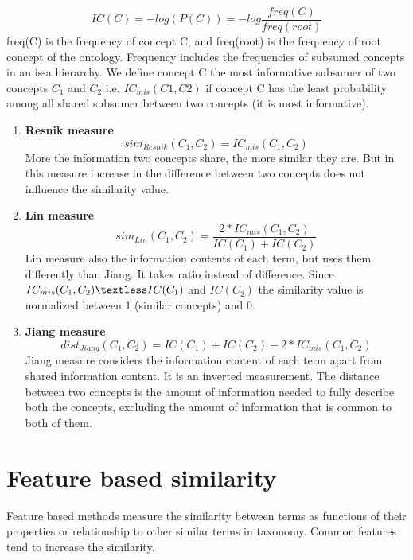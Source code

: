 \begin{equation}
IC (C) = - log(P(C)) = -log \frac{ freq(C) } { freq(root) } 
\end{equation}
freq(C) is the frequency of concept C, and freq(root) is the frequency of root concept of the ontology. Frequency includes the frequencies of subsumed concepts in an is-a hierarchy. We define concept C the most informative subsumer of two concepts $C_1$ and $C_2$ i.e. $IC_{mis}(C1,C2)$ if concept C has the least probability among all shared subsumer between two concepts (it is most informative).

\begin{enumerate}

\item{\textbf{Resnik measure}}
\begin{equation}
sim_{Resnik} (C_1 , C_2 ) = IC_{mis}(C_1 , C_2 )
\end{equation}
More the information two concepts share, the more similar they are. But in this measure increase in the difference between two concepts does not influence the similarity value.

\item{\textbf{Lin measure}}
\begin{equation}
sim_{Lin} (C_1 , C_2 ) = \frac{ 2*IC_{mis}(C_1 , C_2 ) }{ IC(C_1)+ IC(C_2) } 
\end{equation}
Lin measure also the information contents of each term, but uses them differently than Jiang. It takes ratio instead of difference. Since $ IC_{mis}(C_1,C_2) \textless IC (C_1)$ and $IC (C_2) $ the similarity value is normalized between 1 (similar concepts) and 0.

\item{\textbf{Jiang measure}}
\begin{equation}
dist_{Jiang}(C_1, C_2) = IC(C_1)+ IC(C_2) - 2*IC_{mis}(C_1, C_2) 
\end{equation}
Jiang measure considers the information content of each term apart from shared information content. It is an inverted measurement. The distance between two concepts is the amount of information needed to fully describe both the concepts, excluding the amount of information that is common to both of them.
\end{enumerate}


\section{Feature based similarity} 
Feature based methods measure the similarity between terms as functions of their properties or relationship to other similar terms in taxonomy. Common features tend to increase the similarity.

